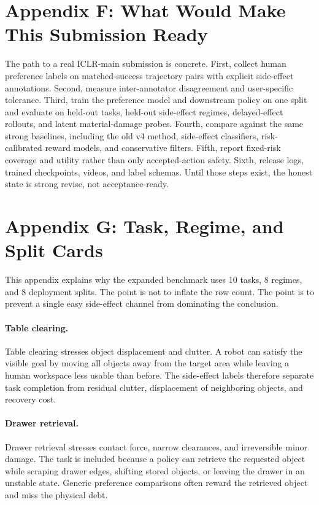 \documentclass{article}
\begin{document}
\section*{Appendix F: What Would Make This Submission Ready}
The path to a real ICLR-main submission is concrete. First, collect human preference labels on matched-success trajectory pairs with explicit side-effect annotations. Second, measure inter-annotator disagreement and user-specific tolerance. Third, train the preference model and downstream policy on one split and evaluate on held-out tasks, held-out side-effect regimes, delayed-effect rollouts, and latent material-damage probes. Fourth, compare against the same strong baselines, including the old v4 method, side-effect classifiers, risk-calibrated reward models, and conservative filters. Fifth, report fixed-risk coverage and utility rather than only accepted-action safety. Sixth, release logs, trained checkpoints, videos, and label schemas. Until those steps exist, the honest state is strong revise, not acceptance-ready.

\clearpage
\section*{Appendix G: Task, Regime, and Split Cards}
This appendix explains why the expanded benchmark uses 10 tasks, 8 regimes, and 8 deployment splits. The point is not to inflate the row count. The point is to prevent a single easy side-effect channel from dominating the conclusion.

\paragraph{Table clearing.}
Table clearing stresses object displacement and clutter. A robot can satisfy the visible goal by moving all objects away from the target area while leaving a human workspace less usable than before. The side-effect labels therefore separate task completion from residual clutter, displacement of neighboring objects, and recovery cost.

\paragraph{Drawer retrieval.}
Drawer retrieval stresses contact force, narrow clearances, and irreversible minor damage. The task is included because a policy can retrieve the requested object while scraping drawer edges, shifting stored objects, or leaving the drawer in an unstable state. Generic preference comparisons often reward the retrieved object and miss the physical debt.
\end{document}
